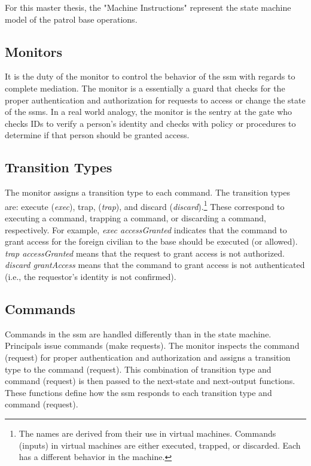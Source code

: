 \documentclass[../../main/main.tex]{subfiles}
\begin{document}
For this master thesis, the "Machine Instructions" represent the state machine model of the patrol base operations.


 
\subsection{Monitors}\label{monitors}
It is the duty of the monitor to control the behavior of the \gls{ssm} with regards to complete mediation.  The monitor is a essentially a guard that checks for the proper authentication and authorization for requests to access or change the state of the \glspl{ssm}.  In a real world analogy, the monitor is the sentry at the gate who checks IDs to verify a person's identity and checks with policy or procedures to determine if that person should be granted access.  

\subsection{Transition Types}
The monitor assigns a transition type to each command.  The transition types are: execute (\textit{exec}), trap, (\textit{trap}), and discard (\textit{discard}).\footnote{The names are derived from their use in virtual machines.  Commands (inputs) in virtual machines are either executed, trapped, or discarded.  Each has a different behavior in the machine.}  These correspond to executing a command, trapping a command, or discarding a command, respectively.  For example, \textit{exec accessGranted} indicates that the command to grant access for the foreign civilian to the base should be executed (or allowed).  \textit{trap accessGranted} means that the request to grant access is not authorized.  \textit{discard grantAccess} means that the command to grant access is not authenticated (i.e., the requestor's identity is not confirmed).

\subsection{Commands}
Commands in the \gls{ssm} are handled differently than in the state machine.  Principals issue commands (make requests).  The monitor inspects the command (request) for proper authentication and authorization and assigns a transition type to the command (request).  This combination of transition type and command (request) is then passed to the next-state and next-output functions.  These functions define how the \gls{ssm} responds to each transition type and command (request).  
\end{document}
